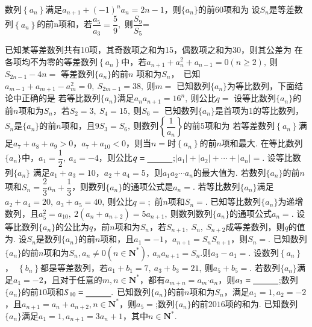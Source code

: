 \documentclass{BHCexam}
\begin{document}
\begin{questions}
\qs 数列$ \left\{a_n\right\} $满足$ a_{n+1}+(-1)^na_n=2n-1 $，则$\{a_n\}$的前$ 60 $项和为\xx
{}
\qs 设$S_n$是等差数列$\left\{a_n\right\}$的前n项和，若$\dfrac{a_5}{a_3}=\dfrac{5}{9}$,~则$ \dfrac{S_9}{S_5} $=\xx
{}

\qs 已知某等差数列共有10项，其奇数项之和为15，偶数项之和为30，则其公差为\xx
{}
\qs 在各项均不为零的等差数列$\left\{a_n\right\}$中，若$ a_{n+1}+a^2_n+a_{n-1}=0(n\ge 2),~$则$ S_{2n-1}-4n= $\xx
{}
\qs 等差数列$\{a_n\}$的前$ n $ 项和为$S_n$，~已知$ a_{m-1}+a_{m+1}-a_m^2=0,~S_{2m-1}=38,~ $则$ m= $\xx
{}
\qs 已知数列$\{a_n\}$为等比数列，下面结论中正确的是\xx
{}
\qs 若等比数列$\{a_n\}$满足$ a_na_{n+1}=16^n,~ $则公比$ q= $\xx
{}
\qs 设等比数列$\{a_n\}$的前$n$项和为$S_n$，若$ S_2=3,~S_4=15,~ $则$ S_6= $\xx
{}
\qs 已知数列$\{a_n\}$是首项为1的等比数列，$S_n$是$\{a_n\}$的前$ n $项和，且$ 9S_3=S_6 ,~$则数列$ \left\{\dfrac{1}{a_n}\right\} $的前$ 5 $项和为\xx
{}
\qs 若等差数列$\left\{a_n\right\}$满足$ a_7+a_8+a_9>0$，$ a_7+a_{10}<0 $，则当$n=$\tk 时$\left\{a_n\right\}$的前$n$项和最大.  
\qs 在等比数列$\{a_n\}$中，$a_1=\dfrac{1}{2},~a_4=-4$，则公比$ q=\underline{\hspace{3em}} $;$ |a_1|+|a_2|+\cdots+|a_n|= $\tk. 
\qs 设等比数列$\{a_n\}$  满足$ a_1+a_3=10 $，$a_2+a_4=5$，则$ a_1a_2\cdots a_n $的最大值为\tk.
\qs 若数列$\{a_n\}$的前$n$项和$S_n=\dfrac{2}{3}a_n+\dfrac{1}{3}$，则数列$\{a_n\}$的通项公式是$a_n=$\tk. 
\qs 若等比数列$\{a_n\}$满足$ a_2+a_4=20,~a_3+a_5=40,~$则公比$ q= $\tk;~前$ n $项和$S_n=$\tk.
\qs 已知等比数列$\{a_n\}$为递增数列，且$ a_5^2=a_{10},~2(a_n+a_{n+2})=5a_{n+1},~ $则数列数列$\{a_n\}$的通项公式$ a_n= $\tk.
\qs 设等比数列$\{a_n\}$的公比为$ q $，前$n$项和为$S_n$，若$ S_{n+1},~S_n,~S_{n+2} $成等差数列，则$ q $的值为\tk.
\question
设$S_n$是数列$\{a_n\}$的前$n$项和，且$a_1=-1$，$a_{n+1}=S_nS_{n+1}$，则$S_n=$\tk.
\qs 已知数列$\{a_n\}$的前$n$项和为$S_n,a_n\ne0\left(n\in\mathbf{N^*}\right),~a_na_{n+1}=S_n$.则$ a_3-a_1 =$\tk.
\qs 设数列$\left\{a_n\right\}$，~$\left\{b_n\right\}$都是等差数列，若$ a_1+b_1=7,~a_3+b_3=21,~ $则$ a_5+b_5= $\tk.
\qs 若数列$\{a_n\}$满足$a_1=-2$，且对于任意的$ m,n \in\mathbf{N^*}$，都有$ a_{m+n}=a_m\bm{\cdot}a_n $，则$ a_3=\underline{\hspace{3em}} $;数列$\{a_n\}$的前$ 10 $项和$ S_{10}=\underline{\hspace{3em}}. $
\qs 已知数列$\{a_n\}$的前$n$项和为$S_n$，满足$a_1=1,a_2=-2$，且$a_{n+1}=a_{n}+a_{n+2},n\in\mathbf{N^*}$，则$ a_5= $\tk;数列$\{a_n\}$的前$ 2016 $项的和为\tk.
\clearpage
\question
已知数列$\{a_n\}$满足$a_1=1,a_{n+1}=3a_n+1$，其中$n\in \mathbf{N^*}.$
\begin{parts}

\end{parts}
\end{questions}
\end{document}
